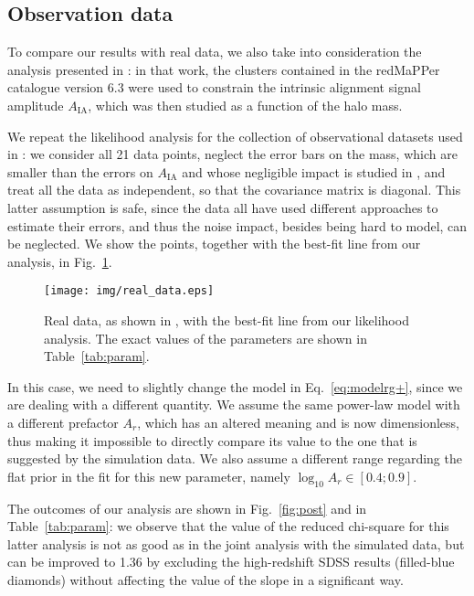 \documentclass[a4paper,11pt]{article}
\begin{document}
\subsection{Observation data}
\label{subsec:obsdatard}
To compare our results with real data, we also take into consideration the analysis presented in \cite{vanUitertJoachimi2017}: in that work, the clusters contained in the redMaPPer catalogue \cite{Rykoffetal2014} version 6.3 were used to constrain the intrinsic alignment signal amplitude $A_{\mathrm{IA}}$, which was then studied as a function of the halo mass.

We repeat the likelihood analysis for the collection of observational datasets used in \cite[figure 7]{vanUitertJoachimi2017}: we consider all 21 data points, neglect the error bars on the mass, which are smaller than the errors on $A_{\mathrm{IA}}$ and whose negligible impact is studied in \cite{vanUitertJoachimi2017}, and treat all the data as independent, so that the covariance matrix is diagonal. This latter assumption is safe, since the data all have used different approaches to estimate their errors, and thus the noise impact, besides being hard to model, can be neglected. We show the points, together with the best-fit line from our analysis, in Fig.~\ref{fig:realdata}.
\begin{figure}
	\centerline{	
	\texttt{[image: img/real\_data.eps]}}
	\caption{Real data, as shown in \cite[figure 7]{vanUitertJoachimi2017}, with the best-fit line from our likelihood analysis. The exact values of the parameters are shown in Table~\ref{tab:param}.}
	\label{fig:realdata}
\end{figure}

In this case, we need to slightly change the model in Eq.~\ref{eq:modelrg+}, since we are dealing with a different quantity. We assume the same power-law model with a different prefactor $A_r$, which 
has an altered meaning and is now dimensionless, thus making it impossible to directly compare its value to the one that is suggested by the simulation data. We also assume a different range regarding the flat prior in the fit for this new parameter, namely $\log_{10} A_r \in [0.4;0.9]$. 

The outcomes of our analysis are shown in Fig.~\ref{fig:post}\protect{} and in Table~\ref{tab:param}: we observe that the value of the reduced chi-square for this latter analysis is not as good as in the joint analysis with the simulated data, but can be improved to 1.36 by excluding the high-redshift SDSS results (filled-blue diamonds) without affecting the value of the slope in a significant way.
\end{document}
